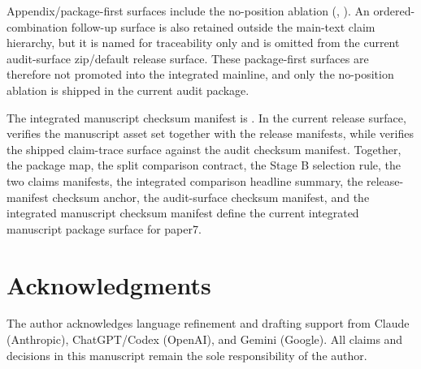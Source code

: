 \documentclass[11pt,a4paper]{article}
\begin{document}
Appendix/package-first surfaces include the no-position ablation
(, ).
An ordered-combination follow-up surface is also retained outside the main-text
claim hierarchy, but it is named for traceability only and is omitted from the
current audit-surface zip/default release surface. These package-first surfaces
are therefore not promoted into the integrated mainline, and only the no-position
ablation is shipped in the current audit package.

The integrated manuscript checksum manifest is
. In the current
release surface,  verifies the manuscript
asset set together with the release manifests, while
 verifies the shipped claim-trace surface
against the audit checksum manifest. Together, the package map, the split
comparison contract, the Stage B selection rule, the two claims manifests, the
integrated comparison headline summary, the release-manifest checksum anchor,
the audit-surface checksum manifest, and the integrated manuscript checksum
manifest define the current integrated manuscript package surface for paper7.

\section*{Acknowledgments}
The author acknowledges language refinement and drafting support from Claude
(Anthropic), ChatGPT/Codex (OpenAI), and Gemini (Google). All claims and
decisions in this manuscript remain the sole responsibility of the author.
\end{document}
